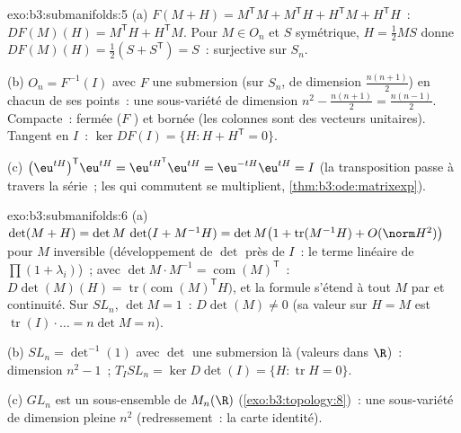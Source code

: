 \begin{solution}{exo:b3:submanifolds:5}
(a) $F(M + H) = M^{\mathsf T}M + M^{\mathsf T}H + H^{\mathsf
T}M + H^{\mathsf T}H$~: $DF(M)(H) = M^{\mathsf T}H +
H^{\mathsf T}M$. Pour $M \in O_n$ et $S$ symétrique, $H =
\frac12MS$ donne $DF(M)(H) = \frac12(S + S^{\mathsf T}) =
S$~: surjective sur $S_n$.

(b) $O_n = F^{-1}(I)$ avec $F$ une submersion (sur $S_n$, de
dimension $\frac{n(n+1)}2$) en chacun de ses points~: une
sous-variété de dimension $n^2 - \frac{n(n+1)}2 =
\frac{n(n-1)}2$. Compacte~: fermée ($F$ ) et bornée
(les colonnes sont des vecteurs unitaires). Tangent en $I$~:
$\ker DF(I) = \{H : H + H^{\mathsf T} = 0\}$.

(c) $\bigl(\eu^{tH}\bigr)^{\mathsf T}\eu^{tH} =
\eu^{tH^{\mathsf T}}\eu^{tH} = \eu^{-tH}\eu^{tH} = I$ (la
transposition passe à travers la série~; les  qui commutent se multiplient,
\cref{thm:b3:ode:matrixexp}).
\end{solution}

\begin{solution}{exo:b3:submanifolds:6}
(a) $\det(M + H) = \det M\,\det(I + M^{-1}H) = \det M\bigl(1
+ \operatorname{tr}(M^{-1}H) + O(\norm H^2)\bigr)$ pour $M$
inversible (développement de $\det$ près de $I$~: le terme
linéaire de $\prod(1 + \lambda_i)$)~; avec $\det M\cdot
M^{-1} = \operatorname{com}(M)^{\mathsf T}$~: $D\det(M)(H) =
\operatorname{tr}\bigl(\operatorname{com}(M)^{\mathsf
T}H\bigr)$, et la formule s'étend à tout $M$ par  et
continuité. Sur $SL_n$, $\det M = 1$~: $D\det(M) \ne 0$ (sa
valeur sur $H = M$ est $\operatorname{tr}(I)\cdot\dots =
n\det M = n$).

(b) $SL_n = \det^{-1}(1)$ avec $\det$ une submersion là
(valeurs dans $\R$)~: dimension $n^2 - 1$~; $T_ISL_n = \ker
D\det(I) = \{H : \operatorname{tr}H = 0\}$.

(c) $GL_n$ est un sous-ensemble \emph{} de $M_n(\R)$
(\cref{exo:b3:topology:8})~: une sous-variété de dimension
pleine $n^2$ (redressement~: la carte identité).
\end{solution}

